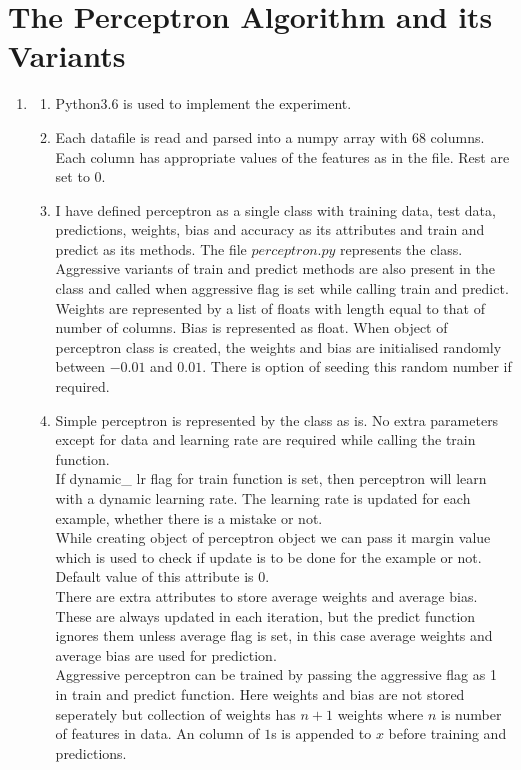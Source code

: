 \section{The Perceptron Algorithm and its Variants}\label{sec:q3}

\begin{enumerate}

	\item
		\begin{enumerate}
	
			\item Python3.6 is used to implement the experiment.\\
			\item Each datafile is read and parsed into a numpy array with 68 columns. Each column has appropriate values of the features as in the file. Rest are set to 0.\\
			\item I have defined perceptron as a single class with training data, test data, predictions, weights, bias and accuracy as its attributes and train and predict as its methods. The file $perceptron.py$ represents the class. Aggressive variants of train and predict methods are also present in the class and called when aggressive flag is set while calling train and predict. Weights are represented by a list of floats with length equal to that of number of columns. Bias is represented as float. When object of perceptron class is created, the weights and bias are initialised randomly between $-0.01$ and $0.01$. There is option of seeding this random number if required.\\
			
			\item Simple perceptron is represented by the class as is. No extra parameters except for data and learning rate are required while calling the train function.\\
				If dynamic\_ lr flag for train function is set, then perceptron will learn with a dynamic learning rate. The learning rate is updated for each example, whether there is a mistake or not.\\
				While creating object of perceptron object we can pass it margin value which is used to check if update is to be done for the example or not. Default value of this attribute is $0$.\\
				There are extra attributes to store average weights and average bias. These are always updated in each iteration, but the predict function ignores them unless average flag is set, in this case average weights and average bias are used for prediction.\\ 
				Aggressive perceptron can be trained by passing the aggressive flag as 1 in train and predict function. Here weights and bias are not stored seperately but collection of weights has $n+1$ weights where $n$ is number of features in data. An column of $1$s is appended to $x$ before training and predictions.
				

\end{enumerate}
\end{enumerate}
